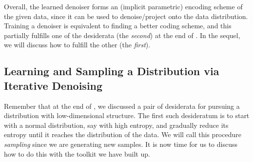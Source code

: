 \documentclass[../../book-main.tex]{subfiles}
\begin{document}
Overall, the learned denoiser forms an (implicit parametric) encoding scheme of the given data, since it can be used to denoise/project onto the data distribution. Training a denoiser is equivalent to finding a better coding scheme, and this partially fulfills one of the desiderata (the \textit{second}) at the end of . In the sequel, we will discuss how to fulfill the other (the \textit{first}).


\subsection{Learning and Sampling a Distribution via Iterative Denoising}\label{sub:sampling_denoising}

Remember that at the end of , we discussed a pair of desiderata for pursuing a distribution with low-dimensional structure. The first such desideratum is to start with a normal distribution, say with high entropy, and gradually reduce its entropy until it reaches the distribution of the data. We will call this procedure \textit{sampling} since we are generating new samples. It is now time for us to discuss how to do this with the toolkit we have built up.
\end{document}
